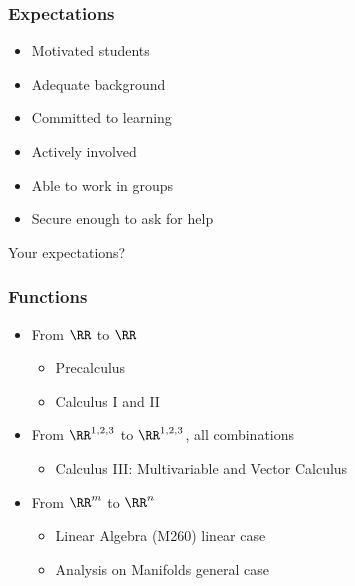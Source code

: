 \begin{frame}
  \frametitle{Expectations}

  \pause

  \begin{itemize}
    \item Motivated students

    \pause

    \item Adequate background

    \pause

    \item Committed to learning

    \pause

    \item Actively involved

    \pause

    \item Able to work in groups

    \pause

    \item Secure enough to ask for help
  \end{itemize}

  \pause

  \begin{center}
    {\Huge Your expectations?}
  \end{center}

\end{frame}

\begin{frame}
  \frametitle{Functions}

  \begin{itemize}
    \item From $\RR$ to $\RR$
    \begin{itemize}
      \item Precalculus
      \item Calculus I and II
    \end{itemize}

    \pause

    \item From $\RR^{1,2,3}$ to $\RR^{1,2,3}$, all combinations
    \begin{itemize}
      \item Calculus III: Multivariable and Vector Calculus
    \end{itemize}

    \pause

    \item From $\RR^m$ to $\RR^n$
    \begin{itemize}
      \item Linear Algebra (M260)  linear case
      \item Analysis on Manifolds  general case
    \end{itemize}
  \end{itemize}

\end{frame}

